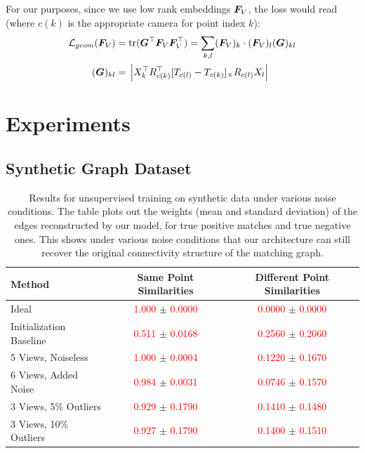 \documentclass{article} %
\newcommand{\cross}[1]{[#1]_{\times}}
\begin{document}
For our purposes, since we use low rank embeddings ${\bm{F}}_{V}$, the loss would read (where $c(k)$ is the appropriate camera for point index $k$):
\begin{align} 
\mathcal{L}_{geom}(\mF_V)
=&\; \mathrm{tr}(\mG^\top \mF_V\mF_V^\top) = \sum_{k,l} (\mF_V)_{k} \cdot (\mF_V)_{l} (\mG)_{kl} \label{eq:geom_cost2} \\
(\mG)_{kl} =&\; \left|X_{k}^\top R_{c(k)}^\top \cross{T_{c(l)} - T_{c(k)}}R_{c(l)} X_{l}\right| \nonumber
\end{align}




\section{Experiments}

\subsection{Synthetic Graph Dataset}

\begin{table}[t]
\begin{center}
\begin{tabular}{|l|c|c|}
\hline
Method & Same Point Similarities & Different Point Similarities  \\
\hline\hline\hline
Ideal                              & \textcolor{red}{1.000} $\pm$ \textcolor{red}{0.0000} & \textcolor{red}{0.0000} $\pm$ \textcolor{red}{0.0000} \\ \hline
Initialization Baseline            & \textcolor{red}{0.511} $\pm$ \textcolor{red}{0.0168} & \textcolor{red}{0.2560} $\pm$ \textcolor{red}{0.2060} \\ \hline
5 Views, Noiseless                 & \textcolor{red}{1.000} $\pm$ \textcolor{red}{0.0004} & \textcolor{red}{0.1220} $\pm$ \textcolor{red}{0.1670} \\ \hline
6 Views, Added Noise               & \textcolor{red}{0.984} $\pm$ \textcolor{red}{0.0031} & \textcolor{red}{0.0746} $\pm$ \textcolor{red}{0.1570} \\ \hline
3 Views, 5\% Outliers              & \textcolor{red}{0.929} $\pm$ \textcolor{red}{0.1790} & \textcolor{red}{0.1410} $\pm$ \textcolor{red}{0.1480} \\ 
3 Views, 10\% Outliers             & \textcolor{red}{0.927} $\pm$ \textcolor{red}{0.1790} & \textcolor{red}{0.1400} $\pm$ \textcolor{red}{0.1510} \\ \hline

\hline
\end{tabular}
\end{center}
\caption{
Results for unsupervised training on synthetic data under various noise conditions.
The table plots out the weights (mean and standard deviation) of the edges reconstructed by our model, for true positive matches and true negative ones.
This shows under various noise conditions that our architecture can still recover the original connectivity structure of the matching graph.
}
\label{fig:synthtable}
\end{table}
\end{document}
